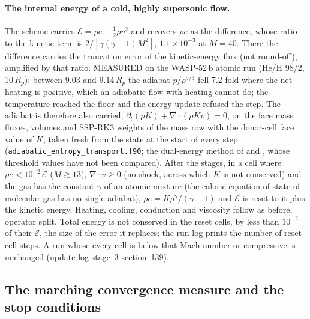 \paragraph{The internal energy of a cold, highly supersonic flow.}  The
scheme carries $\mathcal{E} = \rho e + \tfrac12\rho v^2$ and recovers
$\rho e$ as the difference, whose ratio to the kinetic term is
$2/[\gamma(\gamma-1)M^2]$, $1.1\times10^{-3}$ at $M=40$.  There the
difference carries the truncation error of the kinetic-energy flux (not
round-off), amplified by that ratio.  MEASURED on the \citet{Yan2022}
WASP-52\,b atomic run (He/H 98/2, 10\,$R_p$): between 9.03 and 9.14\,$R_p$
the adiabat $p/\rho^{5/3}$ fell 7.2-fold where the net heating is positive,
which an adiabatic flow with heating cannot do; the temperature reached the
floor and the energy update refused the step.  The adiabat is therefore also
carried, $\partial_t(\rho K) + \nabla\!\cdot(\rho K v) = 0$, on the face mass
fluxes, volumes and SSP-RK3 weights of the mass row with the donor-cell face
value of $K$, taken fresh from the state at the start of every step
(\texttt{adiabatic\_entropy\_transport.f90}; the dual-energy method of
\citealt{Ryu1993} and \citealt{Bryan1995}, whose threshold values have not
been compared).  After the stages, in a cell where $\rho e <
10^{-2}\,\mathcal{E}$ ($M \gtrsim 13$), $\nabla\!\cdot v \ge 0$ (no shock,
across which $K$ is not conserved) and the gas has the constant $\gamma$ of
an atomic mixture (the caloric equation of state of molecular gas has no
single adiabat), $\rho e = K\rho^\gamma/(\gamma-1)$ and $\mathcal{E}$ is
reset to it plus the kinetic energy.  Heating, cooling, conduction and
viscosity follow as before, operator split.  Total energy is not conserved in
the reset cells, by less than $10^{-2}$ of their $\mathcal{E}$, the size of
the error it replaces; the run log prints the number of reset cell-steps.  A
run whose every cell is below that Mach number or compressive is unchanged
(update log stage~3 section~139).

\subsection{The marching convergence measure and the stop conditions}
\label{sec:numerics:du}

